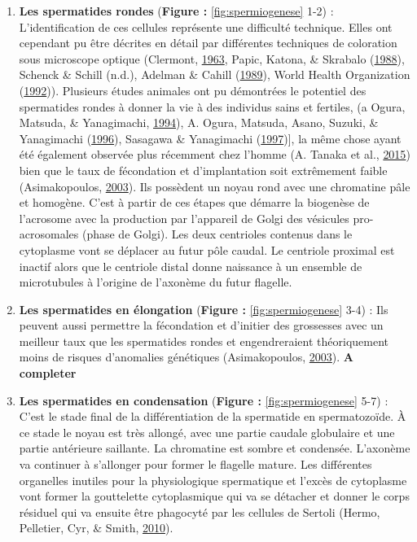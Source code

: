 \documentclass[12pt,twoside]{reedthesis}
\providecommand{\tightlist}{%
  \setlength{\itemsep}{0pt}\setlength{\parskip}{0pt}}
\theoremstyle{definition}
\theoremstyle{definition}
\theoremstyle{remark}
\begin{document}
  \begin{enumerate}
  \def\labelenumi{\arabic{enumi}.}
  \tightlist
  \item
    \textbf{Les spermatides rondes} (\textbf{Figure :
    }\ref{fig:spermiogenese} 1-2) : L'identification de ces cellules
    représente une difficulté technique. Elles ont cependant pu être
    décrites en détail par différentes techniques de coloration sous
    microscope optique (Clermont,
    \protect\hyperlink{ref-Clermont1963}{1963}, Papic, Katona, \& Skrabalo
    (\protect\hyperlink{ref-Papic}{1988}), Schenck \& Schill (n.d.),
    Adelman \& Cahill (\protect\hyperlink{ref-Adelman1989}{1989}), World
    Health Organization
    (\protect\hyperlink{ref-WorldHealthOrganization1992}{1992})).
    Plusieurs études animales ont pu démontrées le potentiel des
    spermatides rondes à donner la vie à des individus sains et fertiles,
    (a Ogura, Matsuda, \& Yanagimachi,
    \protect\hyperlink{ref-Ogura1994}{1994}), A. Ogura, Matsuda, Asano,
    Suzuki, \& Yanagimachi (\protect\hyperlink{ref-Kimura1995}{1996}),
    Sasagawa \& Yanagimachi (\protect\hyperlink{ref-Sasagawa}{1997}){]},
    la même chose ayant été également observée plus récemment chez l'homme
    (A. Tanaka et al., \protect\hyperlink{ref-Tanaka2015}{2015}) bien que
    le taux de fécondation et d'implantation soit extrêmement faible
    (Asimakopoulos, \protect\hyperlink{ref-Asimakopoulos2003}{2003}). Ils
    possèdent un noyau rond avec une chromatine pâle et homogène. C'est à
    partir de ces étapes que démarre la biogenèse de l'acrosome avec la
    production par l'appareil de Golgi des vésicules pro-acrosomales
    (phase de Golgi). Les deux centrioles contenus dans le cytoplasme vont
    se déplacer au futur pôle caudal. Le centriole proximal est inactif
    alors que le centriole distal donne naissance à un ensemble de
    microtubules à l'origine de l'axonème du futur flagelle.\\
  \item
    \textbf{Les spermatides en élongation} (\textbf{Figure :
    }\ref{fig:spermiogenese} 3-4) : Ils peuvent aussi permettre la
    fécondation et d'initier des grossesses avec un meilleur taux que les
    spermatides rondes et engendreraient théoriquement moins de risques
    d'anomalies génétiques (Asimakopoulos,
    \protect\hyperlink{ref-Asimakopoulos2003}{2003}). \textbf{A
    completer}\\
  \item
    \textbf{Les spermatides en condensation} (\textbf{Figure :
    }\ref{fig:spermiogenese} 5-7) : C'est le stade final de la
    différentiation de la spermatide en spermatozoïde. À ce stade le noyau
    est très allongé, avec une partie caudale globulaire et une partie
    antérieure saillante. La chromatine est sombre et condensée. L'axonème
    va continuer à s'allonger pour former le flagelle mature. Les
    différentes organelles inutiles pour la physiologique spermatique et
    l'excès de cytoplasme vont former la gouttelette cytoplasmique qui va
    se détacher et donner le corps résiduel qui va ensuite être phagocyté
    par les cellules de Sertoli (Hermo, Pelletier, Cyr, \& Smith,
    \protect\hyperlink{ref-Hermo2010}{2010}).
  \end{enumerate}
  
\end{document}
